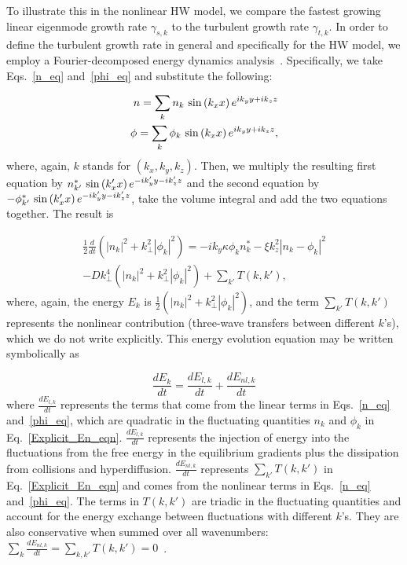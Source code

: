 \documentclass[twocolumn,showkeys,superscriptaddress]{revtex4}
\def\beq{\begin{equation}}
\def\eeq{\end{equation}}
\def\beqar{\begin{eqnarray}}
\def\eeqar{\end{eqnarray}}
\newcommand{\diff}[2]{\frac{d#1}{d#2}}
\begin{document}
To illustrate this in the nonlinear HW model, we compare the fastest growing linear eigenmode growth rate $\gamma_{s,k}$ to the turbulent growth rate $\gamma_{t,k}$. 
In order to define the turbulent growth rate in general and specifically for the HW model, we employ a Fourier-decomposed energy dynamics analysis~\cite{camargo1995,friedman2012b,friedman2013}. 
Specifically, we take Eqs.~\ref{n_eq} and~\ref{phi_eq} and substitute the following:

\beqar
\label{subs_fourier}
n = \sum_{k} n_k \ {\rm sin} \left( k_x x \right) e^{i k_y y + i k_z z} \\
\phi = \sum_{k} \phi_k \ {\rm sin} \left( k_x x \right) e^{i k_y y + i k_z z},
\eeqar
where, again, $k$ stands for $(k_x,k_y,k_z)$.
Then, we multiply the resulting first equation by $n^*_{k'} \ {\rm sin} \left( k'_x x \right) e^{-i k'_y y - i k'_z z}$ and the second equation by 
$-\phi^*_{k'} \ {\rm sin} \left( k'_x x \right) e^{-i k'_y y - i k'_z z}$, take the volume integral and add the two equations together. The result is

\beqar
\label{Explicit_En_eqn}
\frac{1}{2} \diff{}{t} \left( |n_k|^2 + k^2_\perp |\phi_k|^2 \right) = -i k_y \kappa \phi_k n^*_k - \xi k_z^2 |n_k - \phi_k|^2 \nonumber \\
- D k^4_\perp \left( |n_k|^2 + k^2_\perp |\phi_k|^2 \right) + \sum_{k'} T(k,k'), \quad \quad
\eeqar
where, again, the energy $E_k$ is $\frac{1}{2} \left( |n_k|^2 + k^2_\perp |\phi_k|^2 \right)$, 
and the term $\sum_{k'} T(k,k')$ represents the nonlinear contribution (three-wave transfers between different $k$'s), 
which we do not write explicitly. This energy evolution equation may be written symbolically as

\beq
\label{dEdt_def}
\diff{E_k}{t} = \diff{E_{l,k}}{t} + \diff{E_{nl,k}}{t}
\eeq
where $\diff{E_{l,k}}{t}$ represents the terms that come from the linear terms in Eqs.~\ref{n_eq} and~\ref{phi_eq}, which are quadratic in the fluctuating
quantities $n_k$ and $\phi_k$ in Eq.~\ref{Explicit_En_eqn}. 
$\diff{E_{l,k}}{t}$ represents the injection of energy into the fluctuations from the free energy in the equilibrium gradients plus the dissipation from collisions and hyperdiffusion.
$\diff{E_{nl,k}}{t}$ represents $\sum_{k'} T(k,k')$ in  Eq.~\ref{Explicit_En_eqn} and comes from the nonlinear terms in Eqs.~\ref{n_eq} and~\ref{phi_eq}. 
The terms in $T(k,k')$ are triadic in the fluctuating quantities and account for the energy exchange between fluctuations with different $k$'s. 
They are also conservative when summed over all wavenumbers: $\sum_{k} \diff{E_{nl,k}}{t} = \sum_{k,k'} T(k,k') = 0$~\cite{camargo1995}.
\end{document}
